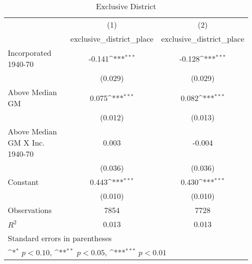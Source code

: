 \begin{table}[htbp]\centering
\def\sym#1{\ifmmode^{#1}\else\(^{#1}\)\fi}
\caption{Exclusive District}
\begin{tabular}{l*{2}{c}}
\hline\hline
                    &\multicolumn{1}{c}{(1)}&\multicolumn{1}{c}{(2)}\\
                    &\multicolumn{1}{c}{exclusive\_district\_place}&\multicolumn{1}{c}{exclusive\_district\_place}\\
\hline
Incorporated 1940-70&      -0.141\sym{***}&      -0.128\sym{***}\\
                    &     (0.029)         &     (0.029)         \\
[1em]
Above Median GM     &       0.075\sym{***}&       0.082\sym{***}\\
                    &     (0.012)         &     (0.013)         \\
[1em]
Above Median GM X Inc. 1940-70&       0.003         &      -0.004         \\
                    &     (0.036)         &     (0.036)         \\
[1em]
Constant            &       0.443\sym{***}&       0.430\sym{***}\\
                    &     (0.010)         &     (0.010)         \\
\hline
Observations        &        7854         &        7728         \\
\(R^{2}\)           &       0.013         &       0.013         \\
\hline\hline
\multicolumn{3}{l}{\footnotesize Standard errors in parentheses}\\
\multicolumn{3}{l}{\footnotesize \sym{*} \(p<0.10\), \sym{**} \(p<0.05\), \sym{***} \(p<0.01\)}\\
\end{tabular}
\end{table}
